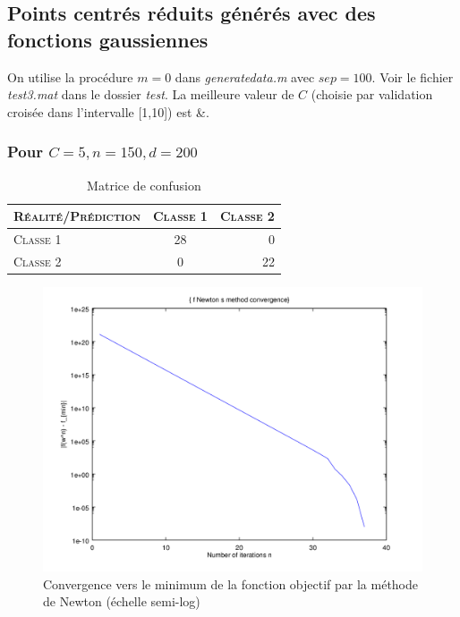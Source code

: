 \documentclass{article}
\begin{document}
\subsection{Points centrés réduits générés avec des fonctions gaussiennes}

On utilise la procédure $m = 0$ dans \emph{generatedata.m} avec $sep=100$. Voir le fichier \emph{test3.mat} dans le dossier \emph{test}. La meilleure valeur de $C$ (choisie par validation croisée dans l'intervalle [1,10]) est &.

\subsubsection{Pour $C=5, n=150, d=200$}

     \begin{table}[H]
       \caption{Matrice de confusion}
       \begin{tabular}{|l|c|r|}
         \hline
         \textsc{Réalité/Prédiction} & \textsc{Classe 1} & \textsc{Classe 2}\\
         \hline
         \textsc{Classe 1} & 28 & 0\\
         \hline
         \textsc{Classe 2} & 0 & 22\\
         \hline
       \end{tabular}
     \end{table}

         \begin{figure}
           \begin{center}
             \includegraphics[scale=0.5]{images/cvnewton3.png}
             \caption{Convergence vers le minimum de la fonction objectif par la méthode de Newton (échelle semi-log)}
           \end{center}
         \end{figure}
\end{document}
